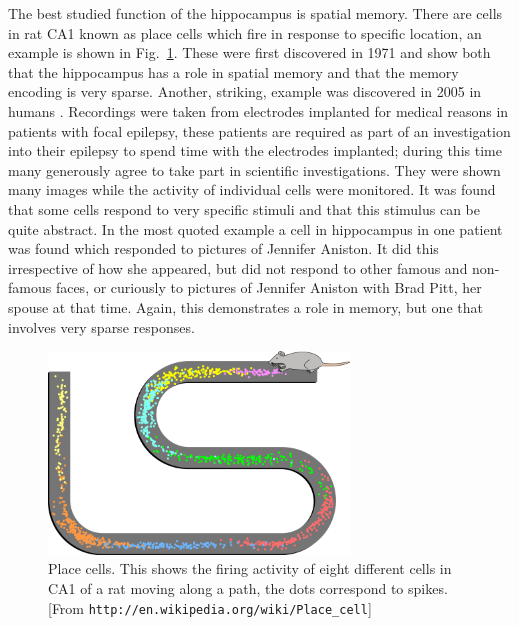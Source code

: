 \documentclass[12pt]{article}
\begin{document}
The best studied function of the hippocampus is spatial memory. There
are cells in rat CA1 known as place cells which fire in response to
specific location, an example is shown in Fig.~\ref{fig:place}. These
were first discovered in 1971 \cite{OKeefeDostrovsky1971a} and show
both that the hippocampus has a role in spatial memory and that the
memory encoding is very sparse. Another, striking, example was
discovered in 2005 in humans \cite{QuianQuirogalEtAl2005a}. Recordings
were taken from electrodes implanted for medical reasons in patients
with focal epilepsy, these patients are required as part of an
investigation into their epilepsy to spend time with the electrodes
implanted; during this time many generously agree to take part in
scientific investigations. They were shown many images while the
activity of individual cells were monitored. It was found that some
cells respond to very specific stimuli and that this stimulus can be
quite abstract. In the most quoted example a cell in hippocampus in
one patient was found which responded to pictures of Jennifer
Aniston. It did this irrespective of how she appeared, but did not
respond to other famous and non-famous faces, or curiously to pictures
of Jennifer Aniston with Brad Pitt, her spouse at that time. Again,
this demonstrates a role in memory, but one that involves very sparse
responses.

\begin{figure}
\begin{center}
\includegraphics[width=8cm]{Place_Cell_Spiking_Activity_Example.png}
\end{center}
\caption{Place cells. This shows the firing activity of eight different cells in CA1 of a rat moving along a path, the dots correspond to spikes. [From \texttt{http://en.wikipedia.org/wiki/Place\_cell}]\label{fig:place}}
\end{figure}
\end{document}
